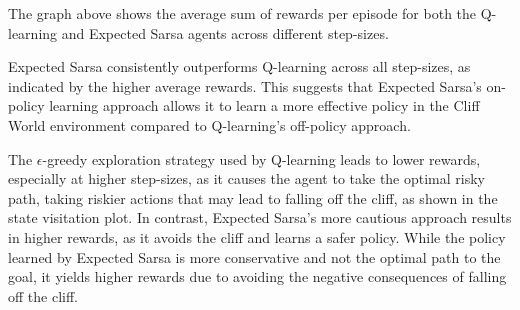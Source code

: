 \documentclass[11pt]{article}
\begin{document}
The graph above shows the average sum of rewards per episode for both the Q-learning and Expected Sarsa agents across different step-sizes.

Expected Sarsa consistently outperforms Q-learning across all step-sizes, as indicated by the higher average rewards. This suggests that Expected Sarsa's on-policy learning approach allows it to learn a more effective policy in the Cliff World environment compared to Q-learning's off-policy approach.

The $\epsilon$-greedy exploration strategy used by Q-learning leads to lower rewards, especially at higher step-sizes, as it causes the agent to take the optimal risky path, taking riskier actions that may lead to falling off the cliff, as shown in the state visitation plot. In contrast, Expected Sarsa's more cautious approach results in higher rewards, as it avoids the cliff and learns a safer policy. While the policy learned by Expected Sarsa is more conservative and not the optimal path to the goal, it yields higher rewards due to avoiding the negative consequences of falling off the cliff.
\end{document}
